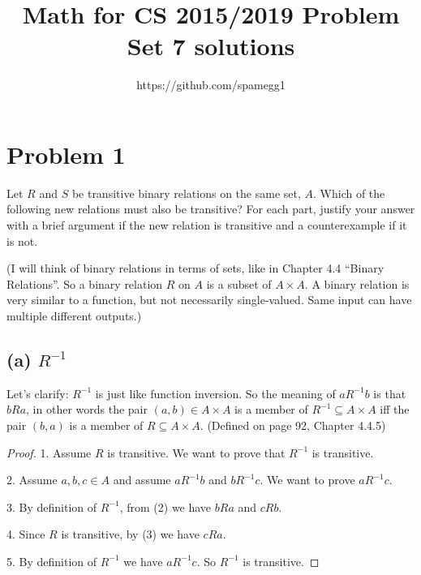 \documentclass[14pt]{extarticle}
\title{Math for CS 2015/2019 Problem Set 7 solutions}
\author{https://github.com/spamegg1}
\begin{document}
\maketitle
\tableofcontents

\section{Problem 1}
Let $R$ and $S$ be transitive binary relations on the same set, $A$. Which of the following new relations must also be transitive? For each part, justify your answer with a brief argument if the new relation is transitive and a counterexample if it is not.

(I will think of binary relations in terms of sets, like in Chapter 4.4 ``Binary Relations''. So a binary relation $R$ on $A$ is a subset of $A \times A$. A binary relation is very similar to a function, but not necessarily single-valued. Same input can have multiple different outputs.)

\subsection{(a) $R^{-1}$} 
Let's clarify: $R^{-1}$ is just like function inversion. So the meaning of $a R^{-1} b$ is that $b R a$, in other words the pair $(a, b) \in A \times A$ is a member of $R^{-1} \subseteq A \times A$ iff the pair $(b,a)$ is a member of $R \subseteq A \times A$. (Defined on page 92, Chapter 4.4.5)
\begin{proof}
1. Assume $R$ is transitive. We want to prove that $R^{-1}$ is transitive.

2. Assume $a, b, c \in A$ and assume $a R^{-1}b$ and $b R^{-1}c$. We want to prove $a R^{-1} c$.

3. By definition of $R^{-1}$, from (2) we have $b R a$ and $c R b$.

4. Since $R$ is transitive, by (3) we have $c R a$.

5. By definition of $R^{-1}$ we have $a R^{-1} c$. So $R^{-1}$ is transitive.
\end{proof}
\end{document}
